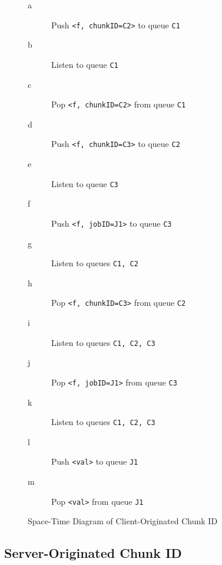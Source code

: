 \documentclass[a4paper,10pt]{article}
\begin{document}
\begin{figure}
\begin{minipage}{0.6\textwidth}
	\end{minipage}
	\begin{minipage}{0.4\textwidth}
		\begin{description}
			\item [\textcolor{dark2-1}{a}] Push \texttt{<f, chunkID=C2>} to queue \texttt{C1}
			\item [\textcolor{mygray}{b}] Listen to queue \texttt{C1}
			\item [\textcolor{dark2-1}{c}] Pop \texttt{<f, chunkID=C2>} from queue \texttt{C1}
			\item [\textcolor{dark2-3}{d}] Push \texttt{<f, chunkID=C3>} to queue \texttt{C2}
			\item [\textcolor{dark2-5}{e}] Listen to queue \texttt{C3}
			\item [\textcolor{dark2-5}{f}] Push \texttt{<f, jobID=J1>} to queue \texttt{C3}
			\item [\textcolor{mygray}{g}] Listen to queues \texttt{C1, C2}
			\item [\textcolor{dark2-3}{h}] Pop \texttt{<f, chunkID=C3>} from queue \texttt{C2}
			\item [\textcolor{mygray}{i}] Listen to queues \texttt{C1, C2, C3}
			\item [\textcolor{dark2-5}{j}] Pop \texttt{<f, jobID=J1>} from queue \texttt{C3}
			\item [\textcolor{mygray}{k}] Listen to queues \texttt{C1, C2, C3}
			\item [\textcolor{dark2-5}{l}] Push \texttt{<val>} to queue \texttt{J1}
			\item [\textcolor{dark2-5}{m}] Pop \texttt{<val>} from queue \texttt{J1}
		\end{description}
	\end{minipage}
	\caption{\label{fig:mci} Space-Time Diagram of Client-Originated Chunk ID}
\end{figure}

\subsection{Server-Originated Chunk ID}
\end{document}
